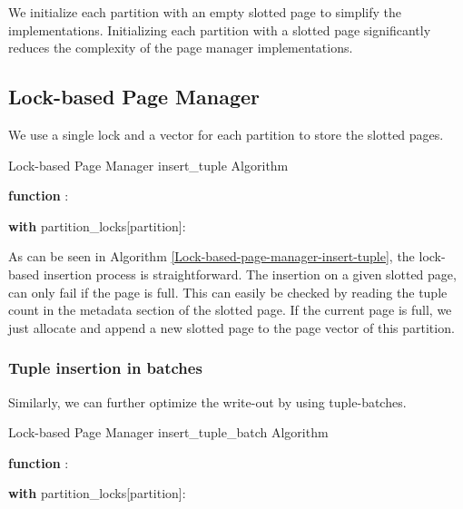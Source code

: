 We initialize each partition with an empty slotted page to simplify the implementations.
Initializing each partition with a slotted page significantly reduces the complexity of the page manager implementations.

\subsection{Lock-based Page Manager}
We use a single lock and a vector for each partition to store the slotted pages.
\begin{algorithm}[h]
  \caption{Lock-based Page Manager insert\_tuple Algorithm}
  \label{Lock-based-page-manager-insert-tuple}



  \textbf{function} :

  \textbf{with} partition\_locks[partition]:
\end{algorithm}
As can be seen in Algorithm \ref{Lock-based-page-manager-insert-tuple}, the lock-based insertion process is straightforward.
The insertion on a given slotted page, can only fail if the page is full.
This can easily be checked by reading the tuple count in the metadata section of the slotted page.
If the current page is full, we just allocate and append a new slotted page to the page vector of this partition.

\subsubsection*{Tuple insertion in batches}
Similarly, we can further optimize the write-out by using tuple-batches.
\begin{algorithm}[h]
  \caption{Lock-based Page Manager insert\_tuple\_batch Algorithm}
  \label{Lock-based-page-manager-insert-tuple-batch}



  \textbf{function} :

  \textbf{with} partition\_locks[partition]:
\end{algorithm}

